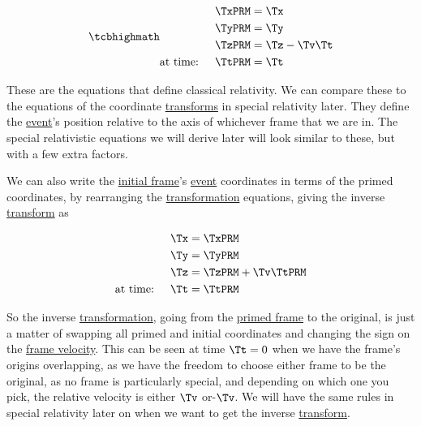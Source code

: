 \begin{equation}
	\mhl{
		\begin{aligned}
			 & {\TxPRM  } = {\Tx }        \\
			 & {\TyPRM  } = {\Ty }        \\
			 & {\TzPRM  } = {\Tz }-{\Tv }{\Tt } \\
			\text{at time: }\quad&  \TtPRM  = {\Tt }
		\end{aligned}
	}
	\label{eq: Galilean transformation}
\end{equation}

These are the equations that define classical relativity.
We can compare these to the equations of the coordinate \hyperlink{def-transform}{transforms} in special relativity later.
They define the \hyperlink{def-event}{event}'s position relative to the axis of whichever frame that we are in.
The special relativistic equations we will derive later will look similar to these, but with a few extra factors.

We can also write the \hyperlink{def-initial-Frame}{initial frame}'s \hyperlink{def-event}{event} coordinates in terms of the primed coordinates, by rearranging the \hyperlink{def-transform}{transformation} equations, giving the inverse \hyperlink{def-transform}{transform} as

\begin{equation}
	\begin{aligned}
		 & {\Tx } = {\TxPRM  }             \\
		 & {\Ty } = {\TyPRM  }             \\
		 & {\Tz } = {\TzPRM  } + {\Tv }\TtPRM  \\
		\text{at time: }\quad&  {\Tt } = \TtPRM
	\end{aligned}
	\label{eq: Inverse Galilean transformation}
\end{equation}

So the inverse \hyperlink{def-transform}{transformation}, going from the \hyperlink{def-Primed-Frame}{primed frame} to the original, is just a matter of swapping all primed and initial coordinates and changing the sign on the \hyperlink{def-frame-velocity}{frame velocity}.
This can be seen at time ${\Tt } = 0$ when we have the frame's origins overlapping, as we have the freedom to choose either frame to be the original, as no frame is particularly special, and depending on which one you pick, the relative velocity is either ${\Tv }$ or-${\Tv }$.
We will have the same rules in special relativity later on when we want to get the inverse \hyperlink{def-transform}{transform}.

